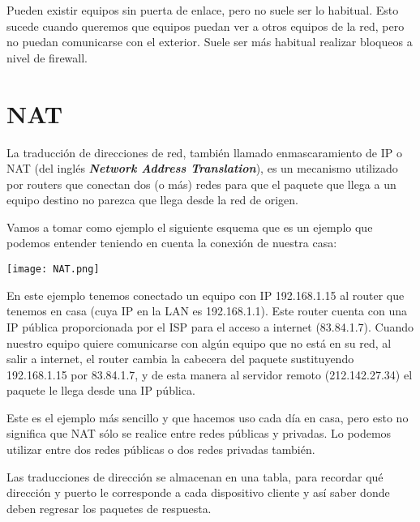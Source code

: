 Pueden existir equipos sin puerta de enlace, pero no suele ser lo habitual. Esto sucede cuando queremos que equipos puedan ver a otros equipos de la red, pero no puedan comunicarse con el exterior. Suele ser más habitual realizar bloqueos a nivel de firewall.


\hypertarget{nat}{}
\section{NAT}
La traducción de direcciones de red, también llamado enmascaramiento de IP o NAT (del inglés \textit{\textbf{Network Address Translation}}), es un mecanismo utilizado por routers que conectan dos (o más) redes para que el paquete que llega a un equipo destino no parezca que llega desde la red de origen.

Vamos a tomar como ejemplo el siguiente esquema que es un ejemplo que podemos entender teniendo en cuenta la conexión de nuestra casa:

\begin{center}
    \vspace{-15pt}
    \texttt{[image: NAT.png]}
    \vspace{-25pt}
\end{center}

En este ejemplo tenemos conectado un equipo con IP 192.168.1.15 al router que tenemos en casa (cuya IP en la LAN es 192.168.1.1). Este router cuenta con una IP pública proporcionada por el ISP para el acceso a internet (83.84.1.7). Cuando nuestro equipo quiere comunicarse con algún equipo que no está en su red, al salir a internet, el router cambia la cabecera del paquete sustituyendo 192.168.1.15 por 83.84.1.7, y de esta manera al servidor remoto (212.142.27.34) el paquete le llega desde una IP pública.

Este es el ejemplo más sencillo y que hacemos uso cada día en casa, pero esto no significa que NAT sólo se realice entre redes públicas y privadas. Lo podemos utilizar entre dos redes públicas o dos redes privadas también.

Las traducciones de dirección se almacenan en una tabla, para recordar qué dirección y puerto le corresponde a cada dispositivo cliente y así saber donde deben regresar los paquetes de respuesta.

